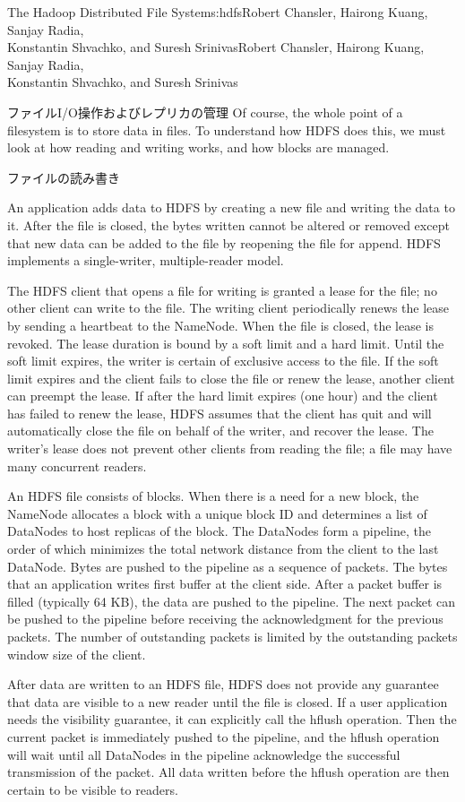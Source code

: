\begin{aosachaptertoc}{The Hadoop Distributed File System}{s:hdfs}{Robert Chansler, Hairong Kuang, Sanjay Radia, \\ Konstantin Shvachko, and Suresh Srinivas}{Robert Chansler, Hairong Kuang, Sanjay Radia, \\ \hspace*{0.9cm} Konstantin Shvachko, and Suresh Srinivas}
\begin{aosasect1}{ファイルI/O操作およびレプリカの管理}
Of course, the whole point of a filesystem is to store data in
files.  To understand how HDFS does this, we must look at how reading
and writing works, and how blocks are managed.

\begin{aosasect2}{ファイルの読み書き}

An application adds data to HDFS by creating a new file and writing
the data to it. After the file is closed, the bytes written cannot be
altered or removed except that new data can be added to the file by
reopening the file for append. HDFS implements a single-writer,
multiple-reader model.

The HDFS client that opens a file for writing is granted a lease for
the file; no other client can write to the file.  The writing client
periodically renews the lease by sending a heartbeat to the
NameNode. When the file is closed, the lease is revoked. The lease
duration is bound by a soft limit and a hard limit. Until the soft
limit expires, the writer is certain of exclusive access to the
file. If the soft limit expires and the client fails to close the file
or renew the lease, another client can preempt the lease. If after the
hard limit expires (one hour) and the client has failed to renew the
lease, HDFS assumes that the client has quit and will automatically
close the file on behalf of the writer, and recover the lease. The
writer's lease does not prevent other clients from reading the file; a
file may have many concurrent readers.

An HDFS file consists of blocks. When there is a need for a new block,
the NameNode allocates a block with a unique block ID and determines a
list of DataNodes to host replicas of the block.  The DataNodes form a
pipeline, the order of which minimizes the total network distance from
the client to the last DataNode. Bytes are pushed to the pipeline as a
sequence of packets. The bytes that an application writes first buffer
at the client side. After a packet buffer is filled (typically 64 KB),
the data are pushed to the pipeline. The next packet can be pushed to
the pipeline before receiving the acknowledgment for the previous
packets.  The number of outstanding packets is limited by the
outstanding packets window size of the client.

After data are written to an HDFS file, HDFS does not provide any
guarantee that data are visible to a new reader until the file is
closed. If a user application needs the visibility guarantee, it can
explicitly call the hflush operation. Then the current packet is
immediately pushed to the pipeline, and the hflush operation will wait
until all DataNodes in the pipeline acknowledge the successful
transmission of the packet. All data written before the hflush
operation are then certain to be visible to readers.


\end{aosasect2}
\end{aosasect1}
\end{aosachaptertoc}
